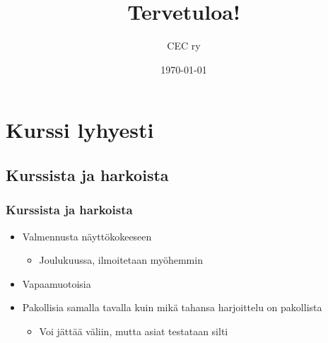 \documentclass[finnish]{beamer}
\title[Linuxin perusteet]{Tervetuloa!} %
\author{CEC ry} %
\institute[] %
{
    \medskip
}
\date{\today} %
\begin{document}
\begin{frame}
    \titlepage%
\end{frame}



\section{Kurssi lyhyesti} %


\begin{frame}
    \subsection{Kurssista ja harkoista}
    \frametitle{Kurssista ja harkoista}
    \begin{itemize}
        \item Valmennusta näyttökokeeseen
            \begin{itemize}
                \item Joulukuussa, ilmoitetaan myöhemmin
            \end{itemize}

        \item Vapaamuotoisia
        \item Pakollisia samalla tavalla kuin mikä tahansa harjoittelu on pakollista
            \begin{itemize}
                \item Voi jättää väliin, mutta asiat testataan silti
            \end{itemize}
    \end{itemize}



\end{frame}
\end{document}
